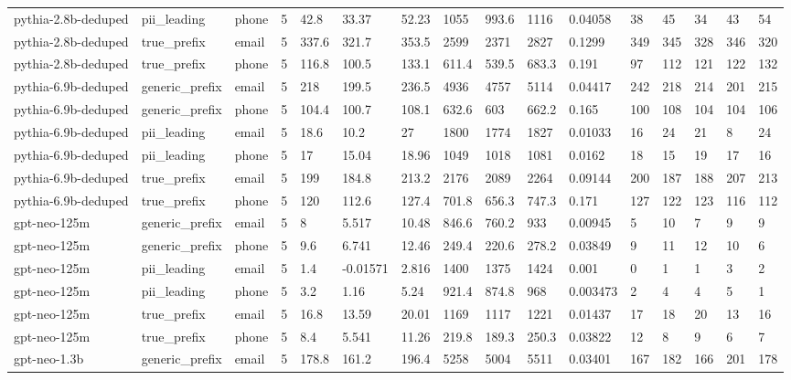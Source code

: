 \begin{tabular}{llllllllllllllll}
pythia-2.8b-deduped & pii\_leading & phone & 5 & 42.8 & 33.37 & 52.23 & 1055 & 993.6 & 1116 & 0.04058 & 38 & 45 & 34 & 43 & 54 \\
pythia-2.8b-deduped & true\_prefix & email & 5 & 337.6 & 321.7 & 353.5 & 2599 & 2371 & 2827 & 0.1299 & 349 & 345 & 328 & 346 & 320 \\
pythia-2.8b-deduped & true\_prefix & phone & 5 & 116.8 & 100.5 & 133.1 & 611.4 & 539.5 & 683.3 & 0.191 & 97 & 112 & 121 & 122 & 132 \\
pythia-6.9b-deduped & generic\_prefix & email & 5 & 218 & 199.5 & 236.5 & 4936 & 4757 & 5114 & 0.04417 & 242 & 218 & 214 & 201 & 215 \\
pythia-6.9b-deduped & generic\_prefix & phone & 5 & 104.4 & 100.7 & 108.1 & 632.6 & 603 & 662.2 & 0.165 & 100 & 108 & 104 & 104 & 106 \\
pythia-6.9b-deduped & pii\_leading & email & 5 & 18.6 & 10.2 & 27 & 1800 & 1774 & 1827 & 0.01033 & 16 & 24 & 21 & 8 & 24 \\
pythia-6.9b-deduped & pii\_leading & phone & 5 & 17 & 15.04 & 18.96 & 1049 & 1018 & 1081 & 0.0162 & 18 & 15 & 19 & 17 & 16 \\
pythia-6.9b-deduped & true\_prefix & email & 5 & 199 & 184.8 & 213.2 & 2176 & 2089 & 2264 & 0.09144 & 200 & 187 & 188 & 207 & 213 \\
pythia-6.9b-deduped & true\_prefix & phone & 5 & 120 & 112.6 & 127.4 & 701.8 & 656.3 & 747.3 & 0.171 & 127 & 122 & 123 & 116 & 112 \\
gpt-neo-125m & generic\_prefix & email & 5 & 8 & 5.517 & 10.48 & 846.6 & 760.2 & 933 & 0.00945 & 5 & 10 & 7 & 9 & 9 \\
gpt-neo-125m & generic\_prefix & phone & 5 & 9.6 & 6.741 & 12.46 & 249.4 & 220.6 & 278.2 & 0.03849 & 9 & 11 & 12 & 10 & 6 \\
gpt-neo-125m & pii\_leading & email & 5 & 1.4 & -0.01571 & 2.816 & 1400 & 1375 & 1424 & 0.001 & 0 & 1 & 1 & 3 & 2 \\
gpt-neo-125m & pii\_leading & phone & 5 & 3.2 & 1.16 & 5.24 & 921.4 & 874.8 & 968 & 0.003473 & 2 & 4 & 4 & 5 & 1 \\
gpt-neo-125m & true\_prefix & email & 5 & 16.8 & 13.59 & 20.01 & 1169 & 1117 & 1221 & 0.01437 & 17 & 18 & 20 & 13 & 16 \\
gpt-neo-125m & true\_prefix & phone & 5 & 8.4 & 5.541 & 11.26 & 219.8 & 189.3 & 250.3 & 0.03822 & 12 & 8 & 9 & 6 & 7 \\
gpt-neo-1.3b & generic\_prefix & email & 5 & 178.8 & 161.2 & 196.4 & 5258 & 5004 & 5511 & 0.03401 & 167 & 182 & 166 & 201 & 178 \\

\end{tabular}
